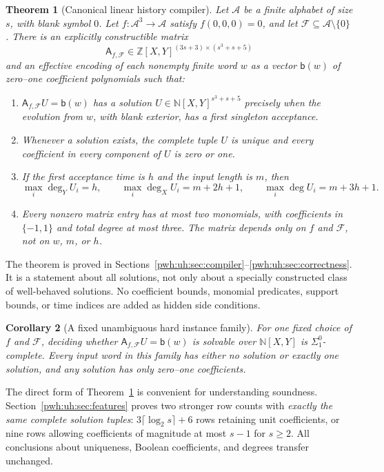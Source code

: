 \documentclass[11pt,letterpaper]{article}
\numberwithin{equation}{section}
\newtheorem{theorem}{Theorem}[section]
\newtheorem{corollary}[theorem]{Corollary}
\theoremstyle{definition}
\newcommand{\N}{\mathbb N}
\newcommand{\Z}{\mathbb Z}
\newcommand{\A}{\mathcal A}
\newcommand{\F}{\mathcal F}
\begin{document}
\begin{theorem}[Canonical linear history compiler]
\label{pwh:uh:thm:main}
Let $\A$ be a finite alphabet of size $s$, with blank symbol $0$. Let
$f:\A^3\to\A$ satisfy $f(0,0,0)=0$, and let
$\F\subseteq\A\setminus\{0\}$. There is an explicitly constructible matrix
\[
  \mathsf A_{f,\F}\in
  \Z[X,Y]^{(3s+3)\times(s^3+s+5)}
\]
and an effective encoding of each nonempty finite word $w$ as a vector
$\mathsf b(w)$ of zero--one coefficient polynomials such that:
\begin{enumerate}[label=\textup{(\roman*)}]
\item $\mathsf A_{f,\F}U=\mathsf b(w)$ has a solution
      $U\in\N[X,Y]^{s^3+s+5}$ precisely when the evolution from $w$, with
      blank exterior, has a first singleton acceptance.
\item Whenever a solution exists, the complete tuple $U$ is unique and
      every coefficient in every component of $U$ is zero or one.
\item If the first acceptance time is $h$ and the input length is $m$, then
\[
 \max_i\deg_Y U_i=h,\qquad
 \max_i\deg_X U_i=m+2h+1,\qquad
 \max_i\deg U_i=m+3h+1.
\]
\item Every nonzero matrix entry has at most two monomials, with
      coefficients in $\{-1,1\}$ and total degree at most three.
      The matrix depends only on $f$ and $\F$, not on $w$, $m$, or $h$.
\end{enumerate}
\end{theorem}

The theorem is proved in Sections~\ref{pwh:uh:sec:compiler}--\ref{pwh:uh:sec:correctness}.
It is a statement about all solutions, not only about a specially
constructed class of well-behaved solutions. No coefficient bounds,
monomial predicates, support bounds, or time indices are added as hidden
side conditions.

\begin{corollary}[A fixed unambiguous hard instance family]
\label{pwh:uh:cor:hard-intro}
For one fixed choice of $f$ and $\F$, deciding whether
$\mathsf A_{f,\F}U=\mathsf b(w)$ is solvable over $\N[X,Y]$ is
$\Sigma^0_1$-complete. Every input word in this family has either no solution
or exactly one solution, and any solution has only zero--one coefficients.
\end{corollary}

The direct form of Theorem~\ref{pwh:uh:thm:main} is convenient for understanding
soundness. Section~\ref{pwh:uh:sec:features} proves two stronger row counts with
\emph{exactly the same complete solution tuples}: $3\lceil\log_2s\rceil+6$
rows retaining unit coefficients, or nine rows allowing coefficients of
magnitude at most $s-1$ for $s\ge2$. All conclusions about uniqueness,
Boolean coefficients, and degrees transfer unchanged.
\end{document}
